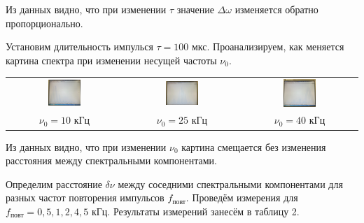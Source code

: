 \documentclass[a4paper]{article}
\theoremstyle{definition}
\theoremstyle{remark}
\begin{document}
\noindent Из данных видно, что при изменении $\tau$ значение $\Delta\omega$ изменяется обратно пропорционально. \medskip

\noindent Установим длительность импулься $\tau = 100$ мкс. Проанализируем, как меняется картина спектра при изменении несущей частоты $\nu_0$.

\medskip

    \begin{center}
        \begin{tabular}{ccc}
        \includegraphics[width=0.30\textwidth]{image/pic10.JPG}&
        \includegraphics[width=0.30\textwidth]{image/pic25.JPG}&
        \includegraphics[width=0.30\textwidth]{image/pic40.JPG}\\
        $\nu_0 = 10$ кГц&
        $\nu_0 = 25$ кГц&
        $\nu_0 = 40$ кГц\\
        \end{tabular}
        \end{center}
        
\noindent Из данных видно, что при изменении $\nu_0$ картина смещается без изменения расстояния между спектральными компонентами.

\newpage

\noindent Определим расстояние $\delta\nu$ между соседними спектральными компонентами для разных частот повторения импульсов $f_{\text{повт}}$. Проведём измерения для $f_{\text{повт}} = 0,5, 1, 2, 4, 5$ кГц. Результаты измерений занесём в таблицу 2.
\end{document}
